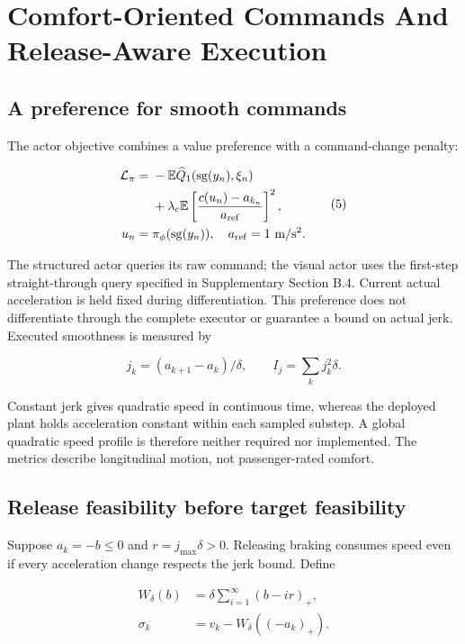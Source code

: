\documentclass[letterpaper,journal]{IEEEtran}
\begin{document}
\section{Comfort-Oriented Commands And Release-Aware Execution}

\subsection{A preference for smooth commands}

The actor objective combines a value preference with a command-change penalty:

\[\begin{aligned}
\mathcal L_\pi={}&-\mathbb E\widehat Q_1(\operatorname{sg}(y_n),\xi_n)\\
&+\lambda_c\mathbb E\left[\frac{c(u_n)-a_{k_n}}{a_{\rm ref}}\right]^2,\\
u_n={}&\pi_\phi(\operatorname{sg}(y_n)),\quad a_{\rm ref}=1\ {\rm m/s^2}.
\end{aligned}\tag{5}\]

The structured actor queries its raw command; the visual actor uses the first-step straight-through query specified in Supplementary Section B.4. Current actual acceleration is held fixed during differentiation. This preference does not differentiate through the complete executor or guarantee a bound on actual jerk. Executed smoothness is measured by

\[j_k=(a_{k+1}-a_k)/\delta,\qquad I_j=\sum_k j_k^2\delta.\tag{6}\]

Constant jerk gives quadratic speed in continuous time, whereas the deployed plant holds acceleration constant within each sampled substep. A global quadratic speed profile is therefore neither required nor implemented. The metrics describe longitudinal motion, not passenger-rated comfort.

\subsection{Release feasibility before target feasibility}

Suppose \(a_k=-b\le0\) and \(r=j_{\max}\delta>0\). Releasing braking consumes speed even if every acceleration change respects the jerk bound. Define

\[\begin{aligned}
W_\delta(b)&=\delta\sum_{i=1}^{\infty}(b-ir)_+,\\
\sigma_k&=v_k-W_\delta((-a_k)_+).
\end{aligned}\tag{7}\]
\end{document}
